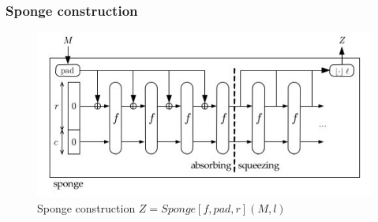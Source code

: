 \documentclass{beamer}
\begin{document}
\begin{frame}
\frametitle{Sponge construction}
\begin{figure}[h]
  \begin{center}
    \includegraphics[scale=0.45]{keccakspongeconstruction.jpg}
  \end{center}
  \caption{Sponge construction $Z = Sponge[f, pad, r](M, l)$\footnotemark}
  \label{fig:lab}
\end{figure}
\end{frame}
\end{document}
